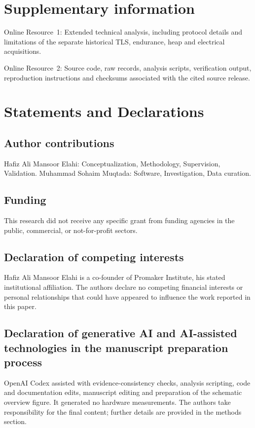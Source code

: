 \documentclass[pdflatex,sn-mathphys-num]{sn-jnl}
\begin{document}
\section*{Supplementary information}
Online Resource~1: Extended technical analysis, including protocol details and limitations of the separate historical TLS, endurance, heap and electrical acquisitions.

Online Resource~2: Source code, raw records, analysis scripts, verification output, reproduction instructions and checksums associated with the cited source release.

\section*{Statements and Declarations}
\subsection*{Author contributions}
Hafiz Ali Mansoor Elahi: Conceptualization, Methodology, Supervision, Validation. Muhammad Sohaim Muqtada: Software, Investigation, Data curation.

\subsection*{Funding}
This research did not receive any specific grant from funding agencies in the public, commercial, or not-for-profit sectors.

\subsection*{Declaration of competing interests}
Hafiz Ali Mansoor Elahi is a co-founder of Promaker Institute, his stated institutional affiliation. The authors declare no competing financial interests or personal relationships that could have appeared to influence the work reported in this paper.

\subsection*{Declaration of generative AI and AI-assisted technologies in the manuscript preparation process}
OpenAI Codex assisted with evidence-consistency checks, analysis scripting, code and documentation edits, manuscript editing and preparation of the schematic overview figure. It generated no hardware measurements. The authors take responsibility for the final content; further details are provided in the methods section.
\end{document}
